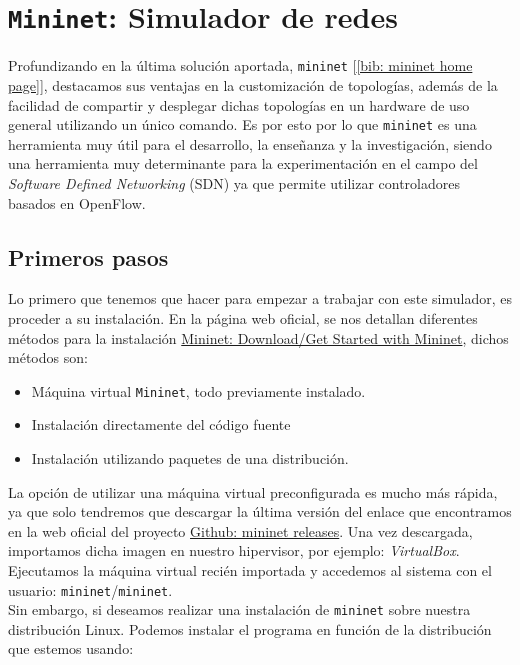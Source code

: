 \documentclass[a4paper, oneside, 12pt]{book}
\begin{document}
	\vspace{10px}
	
	\section{\texttt{Mininet}: Simulador de redes}
	
	\noindent Profundizando en la última solución aportada, \texttt{mininet} [\ref{bib: mininet home page}], destacamos sus ventajas en la customización de topologías, además de la facilidad de compartir y desplegar dichas topologías en un hardware de uso general utilizando un único comando. Es por esto por lo que \texttt{mininet} es una herramienta muy útil para el desarrollo, la enseñanza y la investigación, siendo una herramienta muy determinante para la experimentación en el campo del \textit{Software Defined Networking} (SDN) ya que permite utilizar controladores basados en OpenFlow.
	
	\subsection{Primeros pasos}
	\noindent Lo primero que tenemos que hacer para empezar a trabajar con este simulador, es proceder a su instalación. En la página web oficial, se nos detallan diferentes métodos para la instalación \href{http://mininet.org/download/}{Mininet: Download/Get Started with Mininet}, dichos métodos son: 
	
	\begin{itemize}
		\item Máquina virtual \texttt{Mininet}, todo previamente instalado.
		\item Instalación directamente del código fuente
		\item Instalación utilizando paquetes de una distribución.
	\end{itemize}

	\noindent La opción de utilizar una máquina virtual preconfigurada es mucho más rápida, ya que solo tendremos que descargar la última versión del enlace que encontramos en la web oficial del proyecto \href{https://github.com/mininet/mininet/releases/}{Github: mininet releases}. Una vez descargada, importamos dicha imagen en nuestro hipervisor, por ejemplo: \textit{VirtualBox}. Ejecutamos la máquina virtual recién importada y accedemos al sistema con el usuario: \texttt{mininet}/\texttt{mininet}. \\
	
	 \noindent Sin embargo, si deseamos realizar una instalación de \texttt{mininet} sobre nuestra distribución Linux. Podemos instalar el programa en función de la distribución que estemos usando:
	
\end{document}
